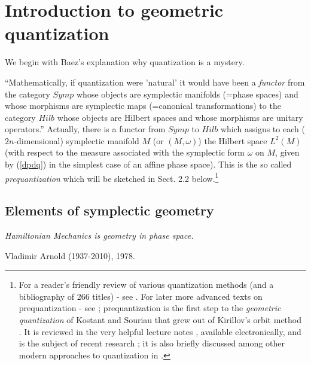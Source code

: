 \documentclass[12pt]{article}
\begin{document}
\bigskip

\section{Introduction to geometric quantization}
\setcounter{equation}{0}
\renewcommand\theequation{\thesection.\arabic{equation}}


\smallskip

 We begin with Baez's explanation \cite{B06} why quantization is a mystery.

``Mathematically, if quantization were 'natural' it would have been a {\it
functor} from the category $Symp$ whose objects are symplectic manifolds
(=phase spaces) and whose morphisms are symplectic maps (=canonical 
transformations)
to the category $Hilb$ whose objects are Hilbert spaces and whose morphisms are
unitary operators.'' Actually, there is a functor from $Symp$ to $Hilb$ which 
assigns to each ($2n$-dimensional) symplectic manifold $M$ (or $(M, \omega)$) 
the Hilbert space $L^2(M)$ (with respect to the measure associated with the symplectic form
 $\omega$ on $M$, given by (\ref{dpdq}) in the simplest case of an affine 
phase space). This is the so called {\it prequantization} which will be 
sketched in Sect. 2.2 below.\footnote{For a reader's friendly review of various 
quantization methods (and a bibliography of 266 titles) - see \cite{AE}. 
For later more advanced texts on prequantization -
 see \cite{WZ, ZZ}; prequantization is the first step to the {\it
geometric quantization} \cite{Wo} of Kostant and Souriau that grew out of
Kirillov's orbit method \cite{K99}. It is reviewed in the very helpful lecture
notes \cite{B}, available electronically, and is the subject of recent research
\cite{H90, AdPW}; it is also briefly discussed among other modern 
approaches to quantization in \cite{GW, G10}.}

\smallskip

\subsection{Elements of symplectic geometry}
\begin{flushright}
{\it Hamiltonian Mechanics is geometry in phase space.}

 Vladimir Arnold (1937-2010), 1978.
\end{flushright}
 
\end{document}
